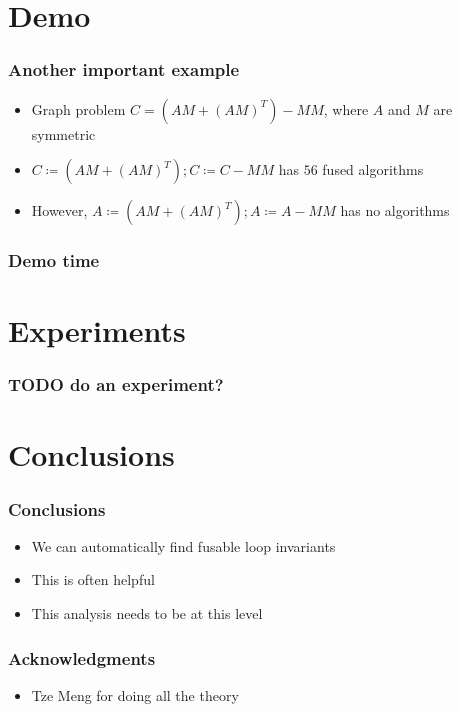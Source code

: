 \documentclass{beamer}
\begin{document}
\section{Demo}

\frame{\sectionpage}

\begin{frame}
  \frametitle{Another important example}
  \begin{itemize}
  \item Graph problem $C = (AM + (AM)^T) - MM$, where $A$ and $M$ are symmetric
  \item $C \coloneqq (AM + (AM)^T); C \coloneqq C - MM$ has $56$ fused algorithms
  \item However, $A \coloneqq (AM + (AM)^T); A \coloneqq A - MM$ has no algorithms
  \end{itemize}
\end{frame}

\begin{frame}
  \frametitle{Demo time}
\end{frame}

\section{Experiments}

\begin{frame}
  \frametitle{TODO do an experiment?}
\end{frame}

\section{Conclusions}

\begin{frame}
  \frametitle{Conclusions}
  \begin{itemize}
  \item We can automatically find fusable loop invariants
  \item This is often helpful
  \item This analysis needs to be at this level
  \end{itemize}
\end{frame}

\begin{frame}
  \frametitle{Acknowledgments}
  \begin{itemize}
  \item Tze Meng for doing all the theory
  \end{itemize}
\end{frame}
\end{document}
